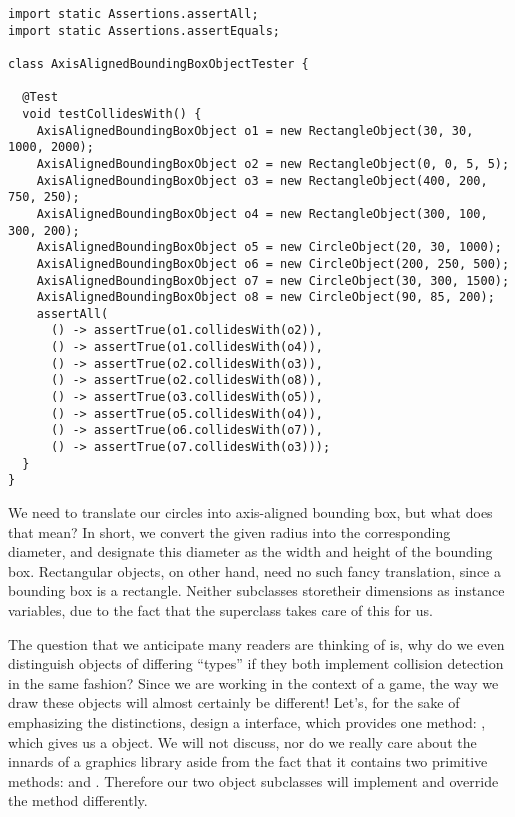 \begin{lstlisting}[language=MyJava]
import static Assertions.assertAll;
import static Assertions.assertEquals;

class AxisAlignedBoundingBoxObjectTester {

  @Test
  void testCollidesWith() {
    AxisAlignedBoundingBoxObject o1 = new RectangleObject(30, 30, 1000, 2000);
    AxisAlignedBoundingBoxObject o2 = new RectangleObject(0, 0, 5, 5);
    AxisAlignedBoundingBoxObject o3 = new RectangleObject(400, 200, 750, 250);
    AxisAlignedBoundingBoxObject o4 = new RectangleObject(300, 100, 300, 200);
    AxisAlignedBoundingBoxObject o5 = new CircleObject(20, 30, 1000);
    AxisAlignedBoundingBoxObject o6 = new CircleObject(200, 250, 500);
    AxisAlignedBoundingBoxObject o7 = new CircleObject(30, 300, 1500);
    AxisAlignedBoundingBoxObject o8 = new CircleObject(90, 85, 200);
    assertAll(
      () -> assertTrue(o1.collidesWith(o2)),
      () -> assertTrue(o1.collidesWith(o4)),
      () -> assertTrue(o2.collidesWith(o3)),
      () -> assertTrue(o2.collidesWith(o8)),
      () -> assertTrue(o3.collidesWith(o5)),
      () -> assertTrue(o5.collidesWith(o4)),
      () -> assertTrue(o6.collidesWith(o7)),
      () -> assertTrue(o7.collidesWith(o3)));
  }
}
\end{lstlisting}

We need to translate our circles into axis-aligned bounding box, but what does that mean? In short, we convert the given radius into the corresponding diameter, and designate this diameter as the width and height of the bounding box. Rectangular objects, on other hand, need no such fancy translation, since a bounding box is a rectangle. Neither subclasses storetheir dimensions as instance variables, due to the fact that the superclass takes care of this for us.

The question that we anticipate many readers are thinking of is, why do we even distinguish objects of differing ``types'' if they both implement collision detection in the same fashion? Since we are working in the context of a game, the way we draw these objects will almost certainly be different! Let's, for the sake of emphasizing the distinctions, design a  interface, which provides one method: , which gives us a  object. We will not discuss, nor do we really care about the innards of a graphics library aside from the fact that it contains two primitive methods:  and . Therefore our two object subclasses will implement  and override the method differently.

